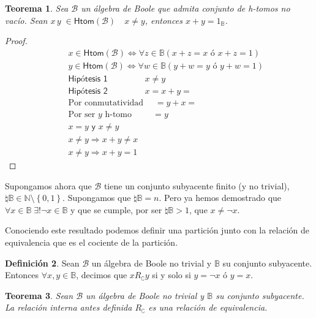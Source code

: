 \documentclass[final,12pt,a4paper,twoside,fleqn]{extbook}
\newcommand{\sthen}{\ensuremath{\Longrightarrow}}
\newcommand{\then}{\ensuremath{\sthen}}
\newcommand{\set}[1]{\ensuremath{\left\lbrace{#1}\right\rbrace}}
\newcommand{\setN}{\ensuremath{\mathds{N}}}
\newcommand{\setB}{\ensuremath{\mathbb{B}}}
\newcommand{\algB}{\ensuremath{\mathscr{B}}}
\newtheorem{thm}{Teorema}[chapter]
\theoremstyle{definition}
\newtheorem{defn}[thm]{Definición}
\theoremstyle{remark}
\begin{document}
\begin{thm}
Sea \(\algB\) un álgebra de Boole que admita conjunto de h-tomos no vacío.
Sean \( x \, y \; \in \mathsf{Htom}\left({\algB}\right) \quad x \neq y \),
entonces \(x + y = 1_\setB \).
\end{thm}



\begin{proof}
\begin{eqnarray}
&&x \in \mathsf{Htom}\left({\algB}\right) \iff \forall z \in \setB \left(x
+ z = x \textsf{ ó } x + z = 1 \right) \\
&&y \in \mathsf{Htom}\left({\algB}\right) \iff \forall w \in \setB \left(y
+ w = y \textsf{ ó } y + w = 1 \right) \\
&&\textsf{Hipótesis   1   } \qquad\qquad x \neq y \\
&&\textsf{Hipótesis   2   } \qquad\qquad x = x + y = \\
&&\text{Por conmutatividad   } \quad = y + x = \\
&&\text{Por ser \(y\) h-tomo} \;\,\qquad = y \\
&& x = y \textsf{ y } x \neq y \\
&& x \neq y \then x + y \neq x \\
&& x \neq y \then x + y = 1
\end{eqnarray}
\end{proof}



	Supongamos ahora que \(\algB\) tiene un conjunto subyacente finito (y no
trivial),  \( \natural \setB \in \setN \setminus \set{0,1} \). Supongamos que
\(\natural \setB = n\). Pero ya hemos demostrado que \( \forall x \in \setB
\; \exists ! \neg x \in \setB \) y que se cumple, por ser \(\natural \setB >
1\), que \(x \neq \neg x\).



	Conociendo este resultado podemos definir una partición junto con la
relación de equivalencia que es el cociente de la partición.



\begin{defn}
Sean \(\algB\) un álgebra de Boole no trivial y \(\setB\) su conjunto
subyacente. Entonces \(\forall x,y \in \setB\), decimos que \(x
R_{\complement} y\) si y solo si \(y = \neg x\) ó \(y = x\).
\end{defn}



\begin{thm}
Sean \(\algB\) un álgebra de Boole no trivial y \(\setB\) su conjunto
subyacente. La relación interna antes definida \(R_{\complement}\) es una
relación de equivalencia.
\end{thm}
\end{document}
